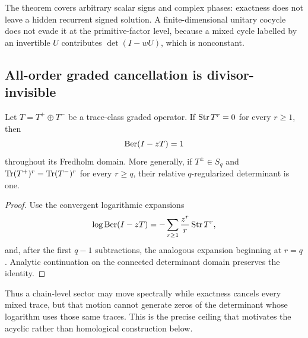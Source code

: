 The theorem covers arbitrary scalar signs and complex phases: exactness
does not leave a hidden recurrent signed solution.  A finite-dimensional
unitary cocycle does not evade it at the primitive-factor level, because a
mixed cycle labelled by an invertible $U$ contributes
$\det(I-wU)$, which is nonconstant.

\subsection{All-order graded cancellation is divisor-invisible}

\begin{theorem}
\label{thm:trace-invisible}
Let $T=T^+\oplus T^-$ be a trace-class graded operator.  If
$\operatorname{Str} T^r=0$ for every $r\ge1$, then
\[
 \operatorname{Ber}(I-zT)=1
\]
throughout its Fredholm domain.  More generally, if $T^\pm\in S_q$ and
$\operatorname{Tr}(T^+)^r=\operatorname{Tr}(T^-)^r$ for every $r\ge q$, their relative
$q$-regularized determinant is one.
\end{theorem}

\begin{proof}
Use the convergent logarithmic expansions
\[
 \log\operatorname{Ber}(I-zT)=-\sum_{r\ge1}\frac{z^r}{r}\operatorname{Str} T^r,
\]
and, after the first $q-1$ subtractions, the analogous expansion beginning at
$r=q$.  Analytic continuation on the connected determinant domain preserves
the identity.
\end{proof}

Thus a chain-level sector may move spectrally while exactness cancels every
mixed trace, but that motion cannot generate zeros of the determinant whose
logarithm uses those same traces.  This is the precise ceiling that motivates
the acyclic rather than homological construction below.
